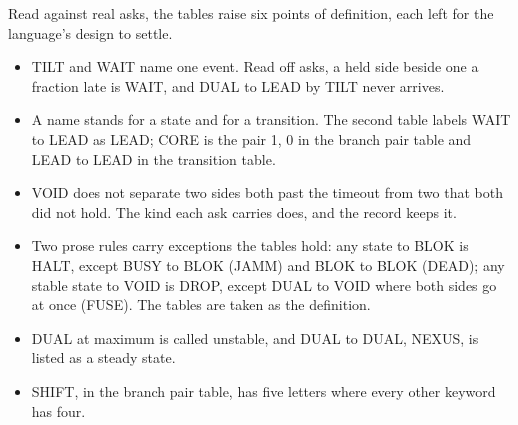 Read against real asks, the tables raise six points of definition, each left for the language's
design to settle.
\begin{itemize}
\item TILT and WAIT name one event. Read off asks, a held side beside one a fraction late is
  WAIT, and DUAL to LEAD by TILT never arrives.
\item A name stands for a state and for a transition. The second table labels WAIT to LEAD as
  LEAD; CORE is the pair 1, 0 in the branch pair table and LEAD to LEAD in the transition table.
\item VOID does not separate two sides both past the timeout from two that both did not hold.
  The kind each ask carries does, and the record keeps it.
\item Two prose rules carry exceptions the tables hold: any state to BLOK is HALT, except BUSY to
  BLOK (JAMM) and BLOK to BLOK (DEAD); any stable state to VOID is DROP, except DUAL to VOID where
  both sides go at once (FUSE). The tables are taken as the definition.
\item DUAL at maximum is called unstable, and DUAL to DUAL, NEXUS, is listed as a steady state.
\item SHIFT, in the branch pair table, has five letters where every other keyword has four.
\end{itemize}
